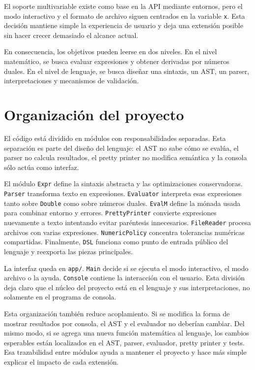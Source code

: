 \documentclass[11pt,a4paper]{article}
\begin{document}
El soporte multivariable existe como base en la API mediante entornos, pero el modo interactivo y el formato de archivo siguen centrados en la variable \texttt{x}. Esta decisión mantiene simple la experiencia de usuario y deja una extensión posible sin hacer crecer demasiado el alcance actual.

En consecuencia, los objetivos pueden leerse en dos niveles. En el nivel matemático, se busca evaluar expresiones y obtener derivadas por números duales. En el nivel de lenguaje, se busca diseñar una sintaxis, un AST, un parser, interpretaciones y mecanismos de validación.

\section{Organización del proyecto}

El código está dividido en módulos con responsabilidades separadas. Esta separación es parte del diseño del lenguaje: el AST no sabe cómo se evalúa, el parser no calcula resultados, el pretty printer no modifica semántica y la consola sólo actúa como interfaz.

El módulo \texttt{Expr} define la sintaxis abstracta y las optimizaciones conservadoras. \texttt{Parser} transforma texto en expresiones. \texttt{Evaluator} interpreta esas expresiones tanto sobre \texttt{Double} como sobre números duales. \texttt{EvalM} define la mónada usada para combinar entorno y errores. \texttt{PrettyPrinter} convierte expresiones nuevamente a texto intentando evitar paréntesis innecesarios. \texttt{FileReader} procesa archivos con varias expresiones. \texttt{NumericPolicy} concentra tolerancias numéricas compartidas. Finalmente, \texttt{DSL} funciona como punto de entrada público del lenguaje y reexporta las piezas principales.

La interfaz queda en \texttt{app/}. \texttt{Main} decide si se ejecuta el modo interactivo, el modo archivo o la ayuda. \texttt{Console} contiene la interacción con el usuario. Esta división deja claro que el núcleo del proyecto está en el lenguaje y sus interpretaciones, no solamente en el programa de consola.

Esta organización también reduce acoplamiento. Si se modifica la forma de mostrar resultados por consola, el AST y el evaluador no deberían cambiar. Del mismo modo, si se agrega una nueva función matemática al lenguaje, los cambios esperables están localizados en el AST, parser, evaluador, pretty printer y tests. Esa trazabilidad entre módulos ayuda a mantener el proyecto y hace más simple explicar el impacto de cada extensión.
\end{document}
